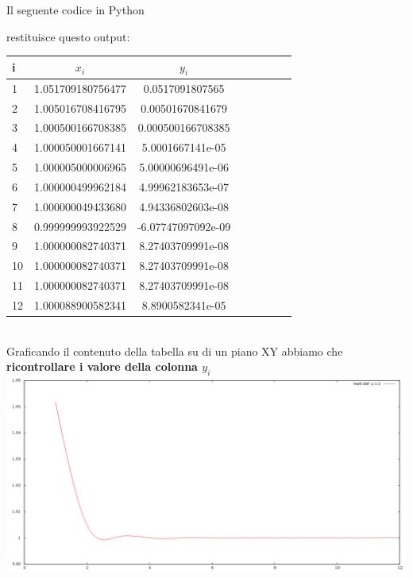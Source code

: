 Il seguente codice in Python


restituisce questo output:

\begin{tabular}{l*{6}{c}r}
i & \( x_i \) & \( y_i \)  \\
\hline
1 & 1.051709180756477  &  0.0517091807565 \\
2 & 1.005016708416795  &  0.00501670841679 \\
3 & 1.000500166708385  &  0.000500166708385 \\
4 & 1.000050001667141  &  5.0001667141e-05 \\
5 & 1.000005000006965  &  5.00000696491e-06 \\
6 & 1.000000499962184  &  4.99962183653e-07 \\
7 & 1.000000049433680  &  4.94336802603e-08 \\
8 & 0.999999993922529  &  -6.07747097092e-09 \\
9 & 1.000000082740371  &  8.27403709991e-08 \\
10 & 1.000000082740371  &  8.27403709991e-08 \\
11 & 1.000000082740371  &  8.27403709991e-08 \\
12 & 1.000088900582341  &  8.8900582341e-05 \\

\end{tabular} \\

Graficando il contenuto della tabella su di un piano XY abbiamo che \\

\textbf{ricontrollare i valore della colonna $y_i$}\\

\includegraphics[scale=0.4]{cap_1/es4/matlab.png}
